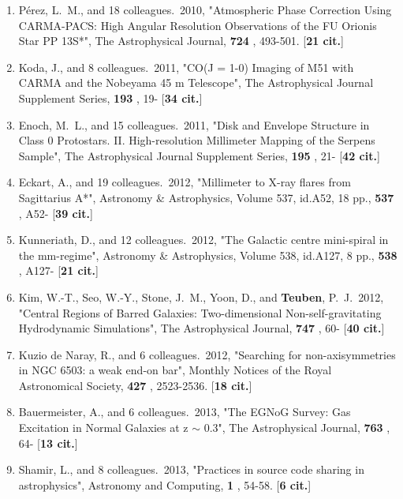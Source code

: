 \documentclass[11pt,letterpaper]{article}
\newcommand{\amp}{\&}
\newcommand{\ap}{$\sim$}
\begin{document}
\begin{enumerate}[label=\textbf{\arabic*}.]
\item  
P{\'e}rez, L.~M., and 18 colleagues.\  2010,  "Atmospheric Phase Correction 
Using CARMA-PACS: High Angular Resolution Observations of the FU Orionis 
Star PP 13S*", The Astrophysical Journal,  {\bf 724} , 493-501.  [{\bf 21 
cit.}] 

\item  
Koda, J., and 8 colleagues.\  2011,  "CO(J = 1-0) Imaging of M51 with CARMA 
and the Nobeyama 45 m Telescope", The Astrophysical Journal Supplement 
Series,  {\bf 193} , 19- [{\bf 34 cit.}] 

\item  
Enoch, M.~L., and 15 colleagues.\  2011,  "Disk and Envelope Structure in 
Class 0 Protostars. II. High-resolution Millimeter Mapping of the Serpens 
Sample", The Astrophysical Journal Supplement Series,  {\bf 195} , 21- 
[{\bf 42 cit.}] 

\item  
Eckart, A., and 19 colleagues.\  2012,  "Millimeter to X-ray flares from 
Sagittarius A*", Astronomy {\amp} Astrophysics, Volume 537, id.A52, 18 
pp.,  {\bf 537} , A52- [{\bf 39 cit.}] 

\item  
Kunneriath, D., and 12 colleagues.\  2012,  "The Galactic centre 
mini-spiral in the mm-regime", Astronomy {\amp} Astrophysics, Volume 538, 
id.A127, 8 pp.,  {\bf 538} , A127- [{\bf 21 cit.}] 

\item  
Kim, W.-T., Seo, W.-Y., Stone, J.~M., Yoon, D., and {\bf Teuben}, P.~J.\  2012,  
"Central Regions of Barred Galaxies: Two-dimensional Non-self-gravitating 
Hydrodynamic Simulations", The Astrophysical Journal,  {\bf 747} , 60- 
[{\bf 40 cit.}] 

\item  
Kuzio de Naray, R., and 6 colleagues.\  2012,  "Searching for 
non-axisymmetries in NGC 6503: a weak end-on bar", Monthly Notices of the 
Royal Astronomical Society,  {\bf 427} , 2523-2536.  [{\bf 18 cit.}] 

\item  
Bauermeister, A., and 6 colleagues.\  2013,  "The EGNoG Survey: Gas 
Excitation in Normal Galaxies at z {\ap} 0.3", The Astrophysical Journal,  
{\bf 763} , 64- [{\bf 13 cit.}] 

\item  
Shamir, L., and 8 colleagues.\  2013,  "Practices in source code sharing in 
astrophysics", Astronomy and Computing,  {\bf 1} , 54-58.  [{\bf 6 cit.}] 


\end{enumerate}
\end{document}
